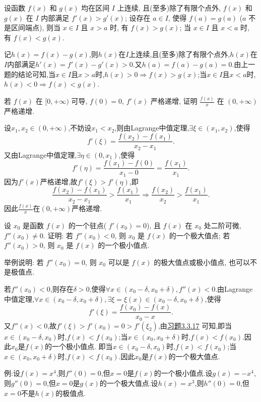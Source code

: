 \begin{exercise}[3.3.17]\label{ex:3.3.17}
    设函数 $f(x)$ 和 $g(x)$ 均在区间 $I$ 上连续, 且(至多)除了有限个点外, $f(x)$ 和 $g(x)$ 在 $I$ 内部满足 $f'(x) > g'(x)$; 设存在 $a \in I$, 使得 $f(a)=g(a)$ ($a$ 不是区间端点), 则当 $x \in I$ 且 $x>a$ 时, 有 $f(x)>g(x)$; 当 $x \in I$ 且 $x<a$ 时, 有 $f(x)<g(x)$.
\end{exercise}

\begin{solution}
    记$h(x) = f(x) - g(x)$,则$h(x)$在$I$上连续,且(至多)除了有限个点外,$h(x)$在$I$内部满足$h'(x) = f'(x) - g'(x) > 0$.又$h(a) = f(a) - g(a) = 0$.由上一题的结论可知,当$x \in I$且$x > a$时,$h(x) > 0 \Rightarrow f(x) > g(x)$;当$x \in I$且$x < a$时,$h(x) < 0 \Rightarrow f(x) < g(x)$.
\end{solution}

\begin{exercise}[3.3.18]
    若 $f(x)$ 在 $[0, +\infty)$ 可导, $f(0)=0$, $f'(x)$ 严格递增, 证明 $\frac{f(x)}{x}$ 在 $(0, +\infty)$ 严格递增.
\end{exercise}

\begin{solution}
    设$x_1,x_2 \in (0,+\infty)$,不妨设$x_1 < x_2$,则由Lagrange中值定理,$\exists \xi \in (x_1,x_2)$,使得
    $$
        f'(\xi) = \frac{f(x_2)-f(x_1)}{x_2 - x_1}.
    $$
    又由Lagrange中值定理,$\exists \eta \in (0,x_1)$,使得
    $$
        f'(\eta) = \frac{f(x_1)-f(0)}{x_1 - 0} = \frac{f(x_1)}{x_1}.
    $$
    因为$f'(x)$严格递增,故$f'(\xi) > f'(\eta)$,即
    $$
        \frac{f(x_2)-f(x_1)}{x_2 - x_1} > \frac{f(x_1)}{x_1} \Rightarrow \frac{f(x_2)}{x_2} > \frac{f(x_1)}{x_1}.
    $$
    因此$\frac{f(x)}{x}$在$(0,+\infty)$严格递增.
\end{solution}

\begin{exercise}[3.3.19]
    设 $x_0$ 是函数 $f(x)$ 的一个驻点( $f'(x_0)=0$), 且 $f(x)$ 在 $x_0$ 处二阶可微, $f''(x_0) \ne 0$. 证明: 若 $f''(x_0)<0$, 则 $x_0$ 是 $f(x)$ 的一个极大值点; 若 $f''(x_0)>0$, 则 $x_0$ 是 $f(x)$ 的一个极小值点. 

    举例说明: 若 $f''(x_0)=0$, 则 $x_0$ 可以是 $f(x)$ 的极大值点或极小值点, 也可以不是极值点.
\end{exercise}

\begin{solution}
    若$f''(x_0) < 0$,则存在$\delta > 0$,使得$\forall x \in (x_0 - \delta, x_0 + \delta), f''(x) < 0$.由Lagrange中值定理,$\forall x\in (x_0 - \delta, x_0 + \delta),\exists \xi=\xi(x) \in (x_0 - \delta, x_0 + \delta)$,使得
    $$
        f'(\xi) = \frac{f(x_0)-f(x)}{x_0 - x}.
    $$
    又$f''(x) < 0$,故$f'(\xi) > f'(x_0) = 0 > f'(\xi_2)$,由\hyperref[ex:3.3.17]{习题3.3.17} 可知,即当$x \in (x_0 - \delta, x_0)$时,$f(x) < f(x_0)$;当$x \in (x_0, x_0 + \delta)$时,$f(x) < f(x_0)$.因此$x_0$是$f(x)$的一个极小值点.
    即当$x \in (x_0 - \delta, x_0)$时,$f(x) < f(x_0)$;当$x \in (x_0, x_0 + \delta)$时,$f(x) < f(x_0)$.因此$x_0$是$f(x)$的一个极大值点.

    例:设$f(x) = x^4$,则$f''(0) = 0$,但$x = 0$是$f(x)$的一个极小值点.设$g(x) = -x^4$,则$g''(0) = 0$,但$x = 0$是$g(x)$的一个极大值点.设$h(x) = x^3$,则$h''(0) = 0$,但$x = 0$不是$h(x)$的极值点.
\end{solution}

